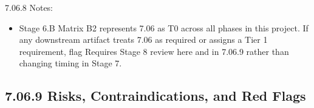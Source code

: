 \documentclass[10pt]{article}
\begin{document}
\endgroup

7.06.8 Notes:

\begin{itemize}
\item Stage 6.B Matrix B2 represents 7.06 as T0 across all phases in this project. If any downstream artifact treats 7.06 as required or assigns a Tier 1 requirement, flag Requires Stage 8 review here and in 7.06.9 rather than changing timing in Stage 7.
\end{itemize}

\subsection*{7.06.9 Risks, Contraindications, and Red Flags}
{}
\end{document}

